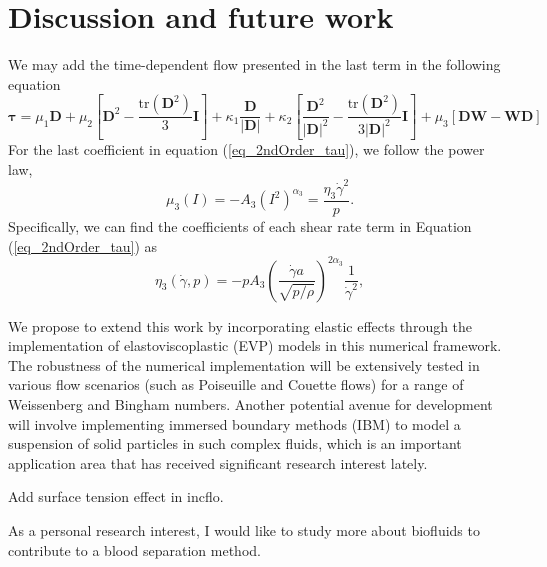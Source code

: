 \section{Discussion and future work}
We may add the time-dependent flow presented in the last term in the following equation
\begin{equation}
  \bm{\tau} =  \mu_1 {\bm D} 
    + \mu_2  \left[ {\bm D}^2  - \frac{\text{tr}\left({\bm D}^2\right)}{3}{\bm I} \right]
   + \kappa_1 \frac{{\bm D}}{|{\bm D}|} 
    + \kappa_2  \left[ \frac{{\bm D}^2}{|{\bm D}|^2}  
    - \frac{\text{tr}\left({\bm D}^2\right)}{3|{\bm D}|^2}{\bm I} \right]
    + \mu_3  \left[ {\bm D}{\bm W} - {\bm W}{\bm D} \right]
  \end{equation}
  For the last coefficient in equation (\ref{eq_2ndOrder_tau}), we follow the power law, 
\begin{equation}
    \mu_3(I) = -A_3 \left( I^2 \right)^{\alpha_3} = \frac{\eta_3 \dot{\gamma}^2}{p}.
\label{eq_muI3}
\end{equation}
Specifically, we can find the coefficients of each shear rate term in Equation (\ref{eq_2ndOrder_tau}) as
\begin{equation}
     \eta_3 (\dot{\gamma}, p) = 
    -p A_3 
        \left( \frac{\dot{\gamma} a }{\sqrt{p/\rho}}  \right)^{2\alpha_3} 
        \frac{1}{\dot{\gamma}^2},
\label{eq_gr_eta_3}
\end{equation}
\par
We propose to extend this work by incorporating elastic effects through the implementation of elastoviscoplastic (EVP) models in this numerical framework. The robustness of the numerical implementation will be extensively tested in various flow scenarios (such as Poiseuille and Couette flows) for a range of Weissenberg and Bingham numbers.  Another potential avenue for development will involve implementing immersed boundary methods (IBM) to model a suspension of solid particles in such complex fluids, which is an important application area that has received significant research interest lately. 
\par
Add surface tension effect in incflo. 
\par 
As a personal research interest, I would like to study more about biofluids to contribute to a blood separation method. 
